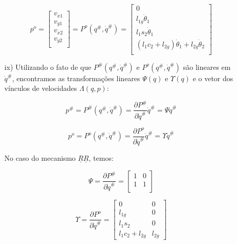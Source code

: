 \begin{itemize}
\begin{itemize}
	\begin{equation}
	p^o = 
	\begin{bmatrix}
	v_{x1} \\
	v_{y1} \\
	v_{x2} \\
	v_{y2} \\
	\end{bmatrix}
	= P^o (q^{\#}, \dot{q}^{\#} ) =
	\begin{bmatrix}
	0 \\
	l_{1g} \dot{\theta}_1 \\
	l_1 s_2 \dot{\theta}_1\\
	(l_1 c_2 + l_{2g} )\dot{\theta}_1 + l_{2g} \dot{\theta}_2 \\
	\end{bmatrix}
	\end{equation}
	
	\item[ix)] Utilizando o fato de que $P^{\#} (q^{\#}, \dot{q}^{\#} ) $ e $P^o (q^{\#}, \dot{q}^{\#} )$ são lineares em $\dot{q}^{\#}$, encontramos as transforma\c{c}\~oes lineares $\Psi(q)$ e $\Upsilon(q)$ e o vetor dos v\'inculos de velocidades $\Lambda(q,p)$:
	
	\begin{equation}
	p^{\#} = P^{\#} (q^{\#}, \dot{q}^{\#} ) = \frac{\partial P^{\#}}{\partial \dot{q}^{\#}} \dot{q}^{\#} = \Psi \dot{q}^{\#}
	\end{equation}
	
	\begin{equation}
	p^o = P^o (q^{\#}, \dot{q}^{\#} ) = \frac{\partial P^o}{\partial \dot{q}^{\#}} \dot{q}^{\#} = \Upsilon \dot{q}^{\#}
	\end{equation}

	No caso do mecanismo $\underline{R}\underline{R}$, temos:
	
	\begin{equation}
	\Psi = \frac{\partial P^{\#}}{\partial \dot{q}^{\#}} =
	\begin{bmatrix}
	1 & 0  \\
	1 & 1  \\
	\end{bmatrix}
	\end{equation}
	
	\begin{equation}
	\Upsilon = \frac{\partial P^o}{\partial \dot{q}^{\#}} =
	\begin{bmatrix}
	0 & 0 \\
	l_{1g} & 0 \\
	l_1 s_2 & 0 \\
	l_1 c_2 + l_{2g} & l_{2g} 
	\end{bmatrix}
	\end{equation}\\


\end{itemize}
\end{itemize}
